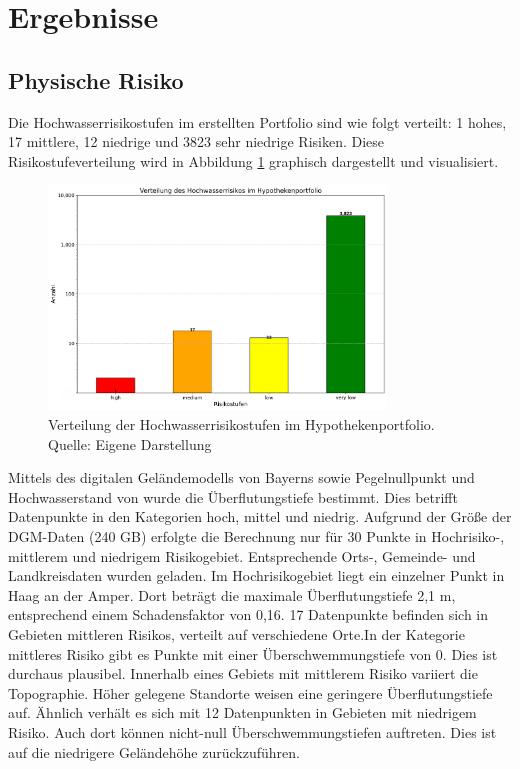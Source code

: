 \section{Ergebnisse}
\subsection{Physische Risiko}
Die Hochwasserrisikostufen im erstellten Portfolio sind wie folgt verteilt: 1 hohes, 17 mittlere, 12 niedrige und 3823 sehr niedrige Risiken. Diese Risikostufeverteilung wird in Abbildung \ref{fig:riskostufe} graphisch dargestellt und visualisiert.
\begin{figure}[htbp]
    \centering
    \includegraphics[width=0.8\textwidth]{figures/hochwasserrisiko_verteilung.png}
    \caption{Verteilung der Hochwasserrisikostufen im Hypothekenportfolio. Quelle: Eigene Darstellung}
    \label{fig:riskostufe}
\end{figure}
\FloatBarrier
Mittels des digitalen Geländemodells von Bayerns sowie Pegelnullpunkt und Hochwasserstand von \textcite{bayern2016hochwassernachrichtendienst} wurde die Überflutungstiefe bestimmt. Dies betrifft Datenpunkte in den Kategorien hoch, mittel und niedrig.
Aufgrund der Größe der \ac{DGM}-Daten (240 GB) erfolgte die Berechnung nur für 30 Punkte in Hochrisiko-, mittlerem und niedrigem Risikogebiet. Entsprechende Orts-, Gemeinde- und Landkreisdaten wurden geladen.
Im Hochrisikogebiet liegt ein einzelner Punkt in Haag an der Amper. Dort beträgt die maximale Überflutungstiefe 2,1 m, entsprechend einem Schadensfaktor von 0,16.
17 Datenpunkte befinden sich in Gebieten mittleren Risikos, verteilt auf verschiedene Orte.In der Kategorie mittleres Risiko gibt es Punkte mit einer Überschwemmungstiefe von 0. Dies ist durchaus plausibel. Innerhalb eines Gebiets mit mittlerem Risiko variiert die Topographie. Höher gelegene Standorte weisen eine geringere Überflutungstiefe auf. Ähnlich verhält es sich mit 12 Datenpunkten in Gebieten mit niedrigem Risiko. Auch dort können nicht-null Überschwemmungstiefen auftreten. Dies ist auf die niedrigere Geländehöhe zurückzuführen. 

